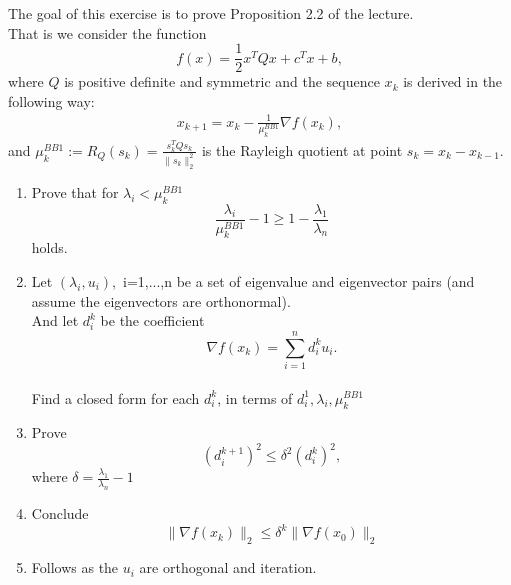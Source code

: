 \documentclass{ExerciseSheet}
\newif\ifsolutions
\begin{document}

\begin{problem}
The goal of this exercise is to prove Proposition 2.2 of the lecture. \\
That is we consider the function 
\begin{equation*}
f(x)= \frac{1}{2} x^TQx + c^Tx +b,    
\end{equation*}
where $Q$ is positive definite and symmetric and the sequence ${x_k}$ is derived in the following way:
\begin{align*}
    x_{k+1}=x_k-\frac{1}{\mu_k^{BB1}} \nabla f(x_k),
\end{align*}
and $\mu_k^{BB1}:=R_Q(s_k)=\frac{s_k^TQs_k}{\|s_k\|_2^2}$ is the Rayleigh quotient at point $s_k=x_k-x_{k-1}$.
\begin{enumerate}
    \item Prove that for $\lambda_i < \mu_k^{BB1}$ 
    $$\frac{\lambda_i}{\mu_k^{BB1}}-1\geq 1 - \frac{\lambda_1}{\lambda_n}$$ holds.
    \item Let $(\lambda_i, u_i),$ i=1,...,n be a set of eigenvalue and eigenvector pairs (and assume the eigenvectors are orthonormal). \\
    And let $d_i^k$ be the coefficient $$\nabla f(x_k)=\sum_{i=1}^n d_i^k u_i.$$\\
    Find a closed form for each $d_i^k$, in terms of $d_i^1, \lambda_i, \mu_k^{BB1}$
    \item Prove $$\left(d_i^{k+1}\right)^2\leq \delta^2 \left(d_i^k\right)^2,$$
    where $\delta=\frac{\lambda_1}{\lambda_n}-1$
    \item Conclude $$\|\nabla f(x_k)\|_2\leq \delta^k \|\nabla f(x_0)\|_2$$
    \item Follows as the $u_i$ are orthogonal and iteration. 
\end{enumerate}
\end{problem}

\ifsolutions
\vskip 0.3cm
\end{document}
